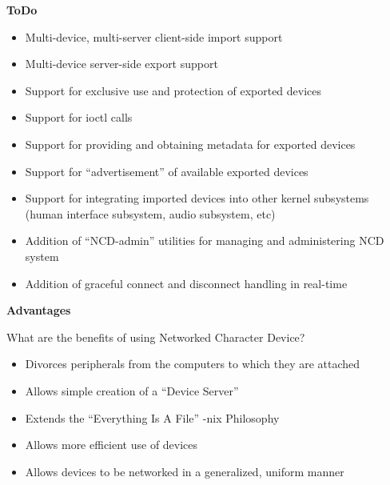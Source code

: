\documentclass[handout]{beamer}
\begin{document}
\begin{frame}{\bf ToDo}

\begin{itemize}
\item<1-> Multi-device, multi-server client-side import support
\item<2-> Multi-device server-side export support
\item<3-> Support for exclusive use and protection of exported devices
\item<4-> Support for ioctl calls
\item<5-> Support for providing and obtaining metadata for exported
  devices
\item<6-> Support for ``advertisement'' of available exported devices
\item<7-> Support for integrating imported devices into other kernel
  subsystems (human interface subsystem, audio subsystem, etc)
\item<8-> Addition of ``NCD-admin'' utilities for managing and administering
  NCD system
\item<9-> Addition of graceful connect and disconnect handling in real-time
\end{itemize}

\end{frame}

\begin{frame}{\bf Advantages}

What are the benefits of using Networked Character Device?

\begin{itemize}
\item<1-> Divorces peripherals from the computers to which they are
  attached
\item<2-> Allows simple creation of a ``Device Server''
\item<3-> Extends the ``Everything Is A File'' -nix Philosophy
\item<4-> Allows more efficient use of devices
\item<5-> Allows devices to be networked in a generalized, uniform manner
\end{itemize}

\end{frame}
\end{document}

